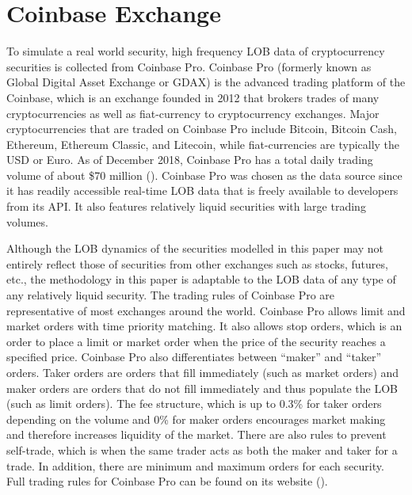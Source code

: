 \section{Coinbase Exchange}

To simulate a real world security, high frequency LOB data of cryptocurrency securities is collected from Coinbase Pro. Coinbase Pro (formerly known as Global Digital Asset Exchange or GDAX) is the advanced trading platform of the Coinbase, which is an exchange founded in 2012 that brokers trades of many cryptocurrencies as well as fiat-currency to cryptocurrency exchanges. Major cryptocurrencies that are traded on Coinbase Pro include Bitcoin, Bitcoin Cash, Ethereum, Ethereum Classic, and Litecoin, while fiat-currencies are typically the USD or Euro. As of December 2018, Coinbase Pro has a total daily trading volume of about \$70 million (\cite{L1}). Coinbase Pro was chosen as the data source since it has readily accessible real-time LOB data that is freely available to developers from its API. It also features relatively liquid securities with large trading volumes. 

Although the LOB dynamics of the securities modelled in this paper may not entirely reflect those of securities from other exchanges such as stocks, futures, etc., the methodology in this paper is adaptable to the LOB data of any type of any relatively liquid security. The trading rules of Coinbase Pro are representative of most exchanges around the world. Coinbase Pro allows limit and market orders with time priority matching. It also allows stop orders, which is an order to place a limit or market order when the price of the security reaches a specified price. Coinbase Pro also differentiates between “maker” and “taker” orders. Taker orders are orders that fill immediately (such as market orders) and maker orders are orders that do not fill immediately and thus populate the LOB (such as limit orders). The fee structure, which is up to 0.3\% for taker orders depending on the volume and 0\% for maker orders encourages market making and therefore increases liquidity of the market. There are also rules to prevent self-trade, which is when the same trader acts as both the maker and taker for a trade. In addition, there are minimum and maximum orders for each security. Full trading rules for Coinbase Pro can be found on its website (\cite{L2}).


